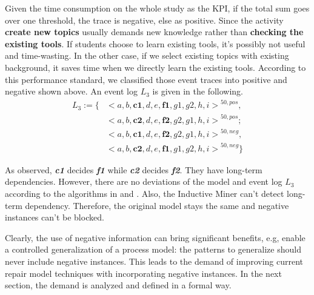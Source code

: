 Given the time consumption on the whole study as the KPI, if the total sum goes over one threshold, the trace is negative, else as positive. Since the activity \textbf{create new topics} usually demands new knowledge rather than \textbf{checking the existing tools}. If students choose to learn existing tools, it's possibly not useful and time-wasting. In the other case, if we select existing topics with existing background, it saves time when we directly learn the existing tools. According to this performance standard, we classified those event traces into positive and negative shown above.
An event log $L_3$ is given in the following. 
\begin{align*}
L_3:= \{ & { <a,b,\textbf{c1},d,e,\textbf{f1},g1,g2, h,i>}^{50, pos}, \\   &{<a,b,\textbf{c2},d,e,\textbf{f2},g2,g1, h,i>}^{50, pos} ; \\
& {<a,b,\textbf{c1},d,e,\textbf{f2},g2,g1,h,i>}^{50, neg}, \\
& {<a,b,\textbf{c2},d,e,\textbf{f1},g1,g2,h,i>}^{50, neg}  \}
\end{align*}

As observed, \textbf{\emph{c1}} decides \textbf{\emph{f1}} while \textbf{\emph{c2}} decides \textbf{\emph{f2}}. They have long-term dependencies.
However, there are no deviations of the model and event log $L_3$ according to the  algorithms in  \cite{fahland2015model} and  \cite{dees2017enhancing}. Also, the Inductive Miner can't detect long-term dependency. Therefore, the original model stays the same and negative instances can't be blocked.

Clearly, the use of negative information can bring significant benefits, e.g, enable a controlled generalization of a process model: the patterns to generalize should never include negative instances. This leads to the demand of improving current repair model techniques with incorporating negative instances. In the next section, the demand is analyzed and defined in a formal way.

